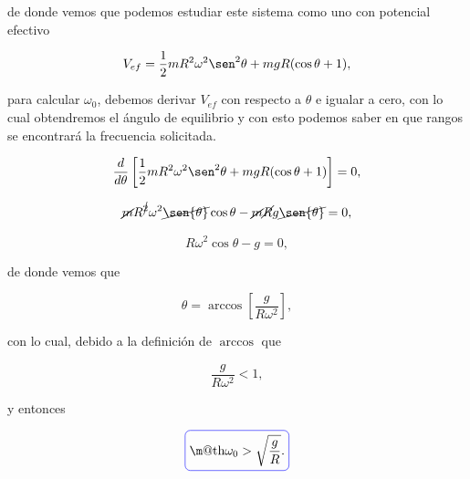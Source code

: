 \documentclass[a4paper,10pt]{article}
\makeatletter
\numberwithin{equation}{section}
\newcommand*{\boxcolor}{blue}
\renewcommand{\boxed}[1]{\textcolor{\boxcolor}{%
\tikz[baseline={([yshift=-1ex]current bounding box.center)}] \node [rectangle, minimum width=1ex,rounded corners,draw] {\normalcolor\m@th$\displaystyle#1$};}}
\makeatother
\begin{document}
de donde vemos que podemos estudiar este sistema como uno con potencial efectivo 

\begin{equation}
 V_{ef} =  \frac{1}{2}mR^2\omega^2\sen^2{\theta}  +  mgR(\cos{\theta} + 1),
\end{equation}

para calcular $\omega_0$, debemos derivar $V_{ef}$ con respecto a $\theta$ e 
igualar a cero, con lo cual obtendremos el ángulo de equilibrio y con esto 
podemos saber en que rangos se encontrará la frecuencia solicitada.

\begin{equation}
 \frac{d}{d\theta} \left[\frac{1}{2}mR^2\omega^2\sen^2{\theta} + 
 mgR(\cos{\theta} + 1) \right] = 0,
\end{equation}

\begin{equation}
 \cancel{m}R^{\cancel{2}}\omega^2\cancel{\sen{\theta}}\cos{\theta} - \cancel{m}\cancel{R} 
 g\cancel{\sen{\theta}} = 0,
\end{equation}

\begin{equation}
 R\omega^2\cos{\theta} - g = 0,
\end{equation}

de donde vemos que 

\begin{equation}
 \theta = \arccos{\left[\frac{g}{R\omega^2}\right]},
\end{equation}

con lo cual, debido a la definición de $\arccos$ que 

\begin{equation}
 \frac{g}{R\omega^2} < 1,
\end{equation}

y entonces 

\begin{equation}
 \boxed{\omega_0 > \sqrt{\frac{g}{R}}.}
\end{equation}
\end{document}
